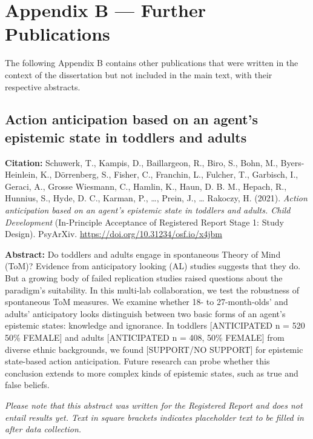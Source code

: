 \documentclass[
]{scrbook}
\begin{document}


\chapter*{Appendix B --- Further Publications}\label{appendixB}

The following Appendix B contains other publications that were written in the context of the dissertation but not included in the main text, with their respective abstracts.

\section*{Action anticipation based on an agent's epistemic state in toddlers and adults}\label{manybabies}

\textbf{Citation:} Schuwerk, T., Kampis, D., Baillargeon, R., Biro, S., Bohn, M., Byers-Heinlein, K., Dörrenberg, S., Fisher, C., Franchin, L., Fulcher, T., Garbisch, I., Geraci, A., Grosse Wiesmann, C., Hamlin, K., Haun, D. B. M., Hepach, R., Hunnius, S., Hyde, D. C., Karman, P., \ldots, Prein, J., \ldots{} Rakoczy, H. (2021). \emph{Action anticipation based on an agent's epistemic state in toddlers and adults. Child Development} (In-Principle Acceptance of Registered Report Stage 1: Study Design). PsyArXiv. \mbox{\url{https://doi.org/10.31234/osf.io/x4jbm}}

\textbf{Abstract:} Do toddlers and adults engage in spontaneous Theory of Mind (ToM)? Evidence from anticipatory looking (AL) studies suggests that they do. But a growing body of failed replication studies raised questions about the paradigm's suitability. In this multi-lab collaboration, we test the robustness of spontaneous ToM measures. We examine whether 18- to 27-month-olds' and adults' anticipatory looks distinguish between two basic forms of an agent's epistemic states: knowledge and ignorance. In toddlers {[}ANTICIPATED n = 520 50\% FEMALE{]} and adults {[}ANTICIPATED n = 408, 50\% FEMALE{]} from diverse ethnic backgrounds, we found {[}SUPPORT/NO SUPPORT{]} for epistemic state-based action anticipation. Future research can probe whether this conclusion extends to more complex kinds of epistemic states, such as true and false beliefs.

\emph{Please note that this abstract was written for the Registered Report and does not entail results yet. Text in square brackets indicates placeholder text to be filled in after data collection.}
\end{document}
